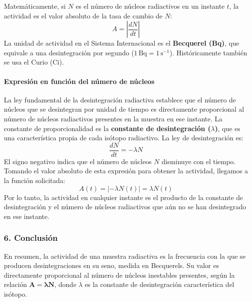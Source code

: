 Matemáticamente, si $N$ es el número de núcleos radiactivos en un instante $t$, la actividad es el valor absoluto de la tasa de cambio de $N$:
$$ A = \left| \frac{dN}{dt} \right| $$
La unidad de actividad en el Sistema Internacional es el \textbf{Becquerel (Bq)}, que equivale a una desintegración por segundo ($1\,\text{Bq} = 1\,\text{s}^{-1}$). Históricamente también se usa el Curio (Ci).

\paragraph{Expresión en función del número de núcleos}
La ley fundamental de la desintegración radiactiva establece que el número de núcleos que se desintegran por unidad de tiempo es directamente proporcional al número de núcleos radiactivos presentes en la muestra en ese instante. La constante de proporcionalidad es la \textbf{constante de desintegración ($\lambda$)}, que es una característica propia de cada isótopo radiactivo.
La ley de desintegración es:
$$ \frac{dN}{dt} = -\lambda N $$
El signo negativo indica que el número de núcleos $N$ disminuye con el tiempo.
Tomando el valor absoluto de esta expresión para obtener la actividad, llegamos a la función solicitada:
$$ A(t) = |-\lambda N(t)| = \lambda N(t) $$
Por lo tanto, la actividad en cualquier instante es el producto de la constante de desintegración y el número de núcleos radiactivos que aún no se han desintegrado en ese instante.

\subsubsection*{6. Conclusión}
\begin{cajaconclusion}
En resumen, la actividad de una muestra radiactiva es la frecuencia con la que se producen desintegraciones en su seno, medida en Becquerels. Su valor es directamente proporcional al número de núcleos inestables presentes, según la relación $\mathbf{A = \lambda N}$, donde $\lambda$ es la constante de desintegración característica del isótopo.
\end{cajaconclusion}

\newpage